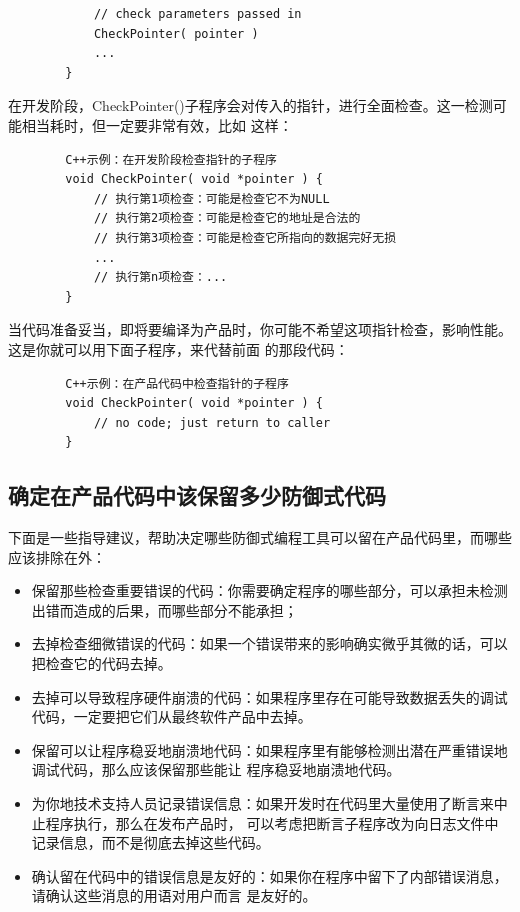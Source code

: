 \documentclass{article}
\begin{document}
\begin{itemize}
\begin{lstlisting}
            // check parameters passed in
            CheckPointer( pointer )
            ...
        }
    \end{lstlisting}
    在开发阶段，CheckPointer()子程序会对传入的指针，进行全面检查。这一检测可能相当耗时，但一定要非常有效，比如
    这样：
    \begin{lstlisting}
        C++示例：在开发阶段检查指针的子程序
        void CheckPointer( void *pointer ) {
            // 执行第1项检查：可能是检查它不为NULL
            // 执行第2项检查：可能是检查它的地址是合法的
            // 执行第3项检查：可能是检查它所指向的数据完好无损
            ...
            // 执行第n项检查：...
        }
    \end{lstlisting}
    当代码准备妥当，即将要编译为产品时，你可能不希望这项指针检查，影响性能。这是你就可以用下面子程序，来代替前面
    的那段代码：
    \begin{lstlisting}
        C++示例：在产品代码中检查指针的子程序
        void CheckPointer( void *pointer ) {
            // no code; just return to caller
        }
    \end{lstlisting}
\end{itemize}

\subsection{确定在产品代码中该保留多少防御式代码}
下面是一些指导建议，帮助决定哪些防御式编程工具可以留在产品代码里，而哪些应该排除在外：
\begin{itemize}
    \item 保留那些检查重要错误的代码：你需要确定程序的哪些部分，可以承担未检测出错而造成的后果，而哪些部分不能承担；
    \item 去掉检查细微错误的代码：如果一个错误带来的影响确实微乎其微的话，可以把检查它的代码去掉。
    \item 去掉可以导致程序硬件崩溃的代码：如果程序里存在可能导致数据丢失的调试代码，一定要把它们从最终软件产品中去掉。
    \item 保留可以让程序稳妥地崩溃地代码：如果程序里有能够检测出潜在严重错误地调试代码，那么应该保留那些能让
    程序稳妥地崩溃地代码。
    \item 为你地技术支持人员记录错误信息：如果开发时在代码里大量使用了断言来中止程序执行，那么在发布产品时，
    可以考虑把断言子程序改为向日志文件中记录信息，而不是彻底去掉这些代码。
    \item 确认留在代码中的错误信息是友好的：如果你在程序中留下了内部错误消息，请确认这些消息的用语对用户而言
    是友好的。
\end{itemize}
\end{document}
